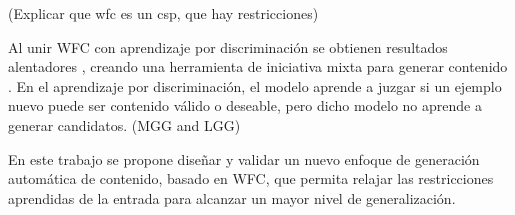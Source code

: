 (Explicar que wfc es un csp, que hay restricciones)

Al unir WFC con aprendizaje por discriminación \cite{bib:12} se obtienen resultados
alentadores \cite{bib:3}, creando una herramienta de iniciativa mixta 
para generar contenido \cite{bib:4}. En el aprendizaje por 
discriminación, el modelo aprende a juzgar si un ejemplo nuevo
puede ser contenido válido o deseable, pero dicho modelo no aprende
a generar candidatos. (MGG and LGG)

En este trabajo se propone diseñar y validar un nuevo enfoque de generación
automática de contenido, basado en WFC, que permita relajar las restricciones 
aprendidas de la entrada para alcanzar un mayor nivel de generalización.



